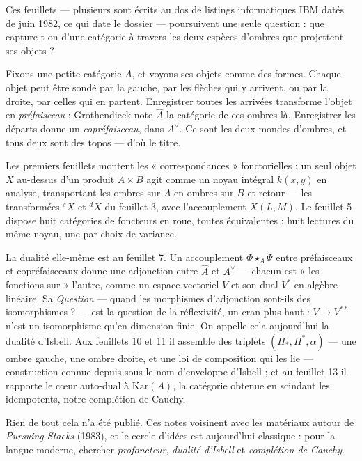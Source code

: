 \documentclass[11pt,a4paper]{article}
\begin{document}
\begin{summary}
Ces feuillets — plusieurs sont écrits au dos de listings informatiques IBM
datés de juin 1982, ce qui date le dossier — poursuivent une seule question :
que capture-t-on d'une catégorie à travers les deux espèces d'ombres que
projettent ses objets ?

Fixons une petite catégorie $A$, et voyons ses objets comme des formes. Chaque
objet peut être sondé par la gauche, par les flèches qui y arrivent, ou par la
droite, par celles qui en partent. Enregistrer toutes les arrivées transforme
l'objet en \emph{préfaisceau} ; Grothendieck note $\widehat{A}$ la catégorie
de ces ombres-là. Enregistrer les départs donne un \emph{copréfaisceau}, dans
$A^{\vee}$. Ce sont les deux mondes d'ombres, et tous deux sont des topos —
d'où le titre.

Les premiers feuillets montent les « correspondances » fonctorielles : un seul
objet $X$ au-dessus d'un produit $A \times B$ agit comme un noyau intégral
$k(x,y)$ en analyse, transportant les ombres sur $A$ en ombres sur $B$ et
retour — les transformées ${}^{s}X$ et ${}^{d}X$ du feuillet 3, avec
l'accouplement $X(L,M)$. Le feuillet 5 dispose huit catégories de foncteurs en
roue, toutes équivalentes : huit lectures du même noyau, une par choix de
variance.

La dualité elle-même est au feuillet 7. Un accouplement $\Phi \star_{A} \Psi$
entre préfaisceaux et copréfaisceaux donne une adjonction entre $\widehat{A}$
et $A^{\vee}$ — chacun est « les fonctions sur » l'autre, comme un espace
vectoriel $V$ et son dual $V^{*}$ en algèbre linéaire. Sa \emph{Question} —
quand les morphismes d'adjonction sont-ils des isomorphismes ? — est la
question de la réflexivité, un cran plus haut : $V \to V^{**}$ n'est un
isomorphisme qu'en dimension finie. On appelle cela aujourd'hui la dualité
d'Isbell. Aux feuillets 10 et 11 il assemble des triplets
$(H_{*}, H^{*}, \alpha)$ — une ombre gauche, une ombre droite, et une loi de
composition qui les lie — construction connue depuis sous le nom d'enveloppe
d'Isbell ; et au feuillet 13 il rapporte le cœur auto-dual à
$\mathrm{Kar}(A)$, la catégorie obtenue en scindant les idempotents, notre
complétion de Cauchy.

Rien de tout cela n'a été publié. Ces notes voisinent avec les matériaux
autour de \emph{Pursuing Stacks} (1983), et le cercle d'idées est aujourd'hui
classique : pour la langue moderne, chercher \emph{profoncteur}, \emph{dualité
d'Isbell} et \emph{complétion de Cauchy}.
\end{summary}
\end{document}
